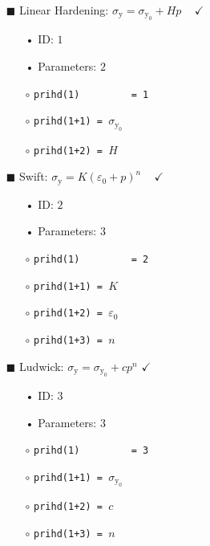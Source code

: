 \documentclass[11pt,a4paper,twoside,final,onecolumn,titlepage]{article}
\newcommand{\verified}{\hspace{0.5pt} {\LARGE $\checkmark$}}
\begin{document}
\begin{itemize}
	\item[\tiny$\blacksquare$] Linear Hardening: $\displaystyle \sigma_{\textrm{y}} = \sigma_{\textrm{y}_0} + Hp$\,\,\,\,\,\verified{} 
	\begin{itemize}
		\item[•] ID: $1$
		\item[•] Parameters: $2$\\
		\item[$\circ$] \texttt{prihd(1)\,\,\,\,\,\,\,\,\,= 1}
		\item[$\circ$] \texttt{prihd(1+1) = $\sigma_{\textrm{y}_0} $}
		\item[$\circ$] \texttt{prihd(1+2) = $H$}\\
	\end{itemize}
\end{itemize}

\newpage
\begin{itemize}
	\item[\tiny$\blacksquare$] Swift: $\displaystyle \sigma_{\textrm{y}} = K\left(\varepsilon_{0}+p\right)^n$\,\,\,\,\,\verified{} 
	\begin{itemize}
		\item[•] ID: $2$
		\item[•] Parameters: $3$\\
		\item[$\circ$] \texttt{prihd(1)\,\,\,\,\,\,\,\,\,= 2}
		\item[$\circ$] \texttt{prihd(1+1) = $K$} 
		\item[$\circ$] \texttt{prihd(1+2) = $\varepsilon_0$} 
		\item[$\circ$] \texttt{prihd(1+3) = $n$}\\
	\end{itemize}
\end{itemize}

\begin{itemize}
	\item[\tiny$\blacksquare$] Ludwick: $\displaystyle \sigma_{\textrm{y}} = \sigma_{\textrm{y}_0} +cp^n$ \verified{}
	\begin{itemize}
		\item[•] ID: $3$
		\item[•] Parameters: $3$\\
		\item[$\circ$] \texttt{prihd(1)\,\,\,\,\,\,\,\,\,= 3}
		\item[$\circ$] \texttt{prihd(1+1) = $\sigma_{\textrm{y}_0} $}
		\item[$\circ$] \texttt{prihd(1+2) = $c$}
		\item[$\circ$] \texttt{prihd(1+3) = $n$}\\
	\end{itemize}
\end{itemize}
\end{document}
